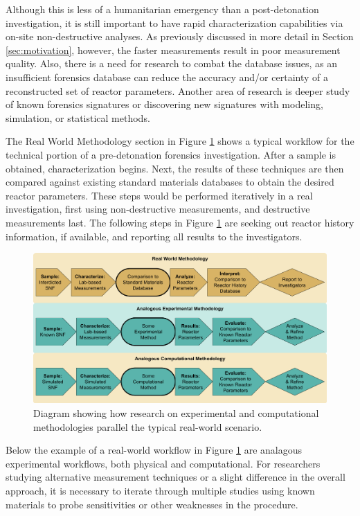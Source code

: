 Although this is less of a humanitarian emergency than a post-detonation
investigation, it is still important to have rapid characterization
capabilities via on-site non-destructive analyses.  As previously discussed in
more detail in Section \ref{sec:motivation}, however, the faster measurements
result in poor measurement quality. Also, there is a need for research to
combat the database issues, as an insufficient forensics database can reduce
the accuracy and/or certainty of a reconstructed set of reactor parameters.
Another area of research is deeper study of known forensics signatures or
discovering new signatures with modeling, simulation, or statistical methods. 

The Real World Methodology section in Figure \ref{fig:nfworkflow} shows a
typical workflow for the technical portion of a pre-detonation forensics
investigation.  After a sample is obtained, characterization begins.  Next, the
results of these techniques are then compared against existing standard
materials databases to obtain the desired reactor parameters. These steps would
be performed iteratively in a real investigation, first using non-destructive
measurements, and destructive measurements last.  The following steps in Figure
\ref{fig:nfworkflow} are seeking out reactor history information, if available,
and reporting all results to the investigators. 

\begin{figure}[!h]
  \includegraphics[width=\linewidth]{./chapters/intro/ForensicsWorkflows.png}
  \caption{Diagram showing how research on experimental and computational methodologies parallel the typical real-world scenario.}
  \label{fig:nfworkflow}
\end{figure}

Below the example of a real-world workflow in Figure \ref{fig:nfworkflow} are
analagous experimental workflows, both physical and computational.  
For researchers studying
alternative measurement techniques or a slight difference in the overall
approach, it is necessary to iterate through multiple studies using known
materials to probe sensitivities or other weaknesses in the procedure.

